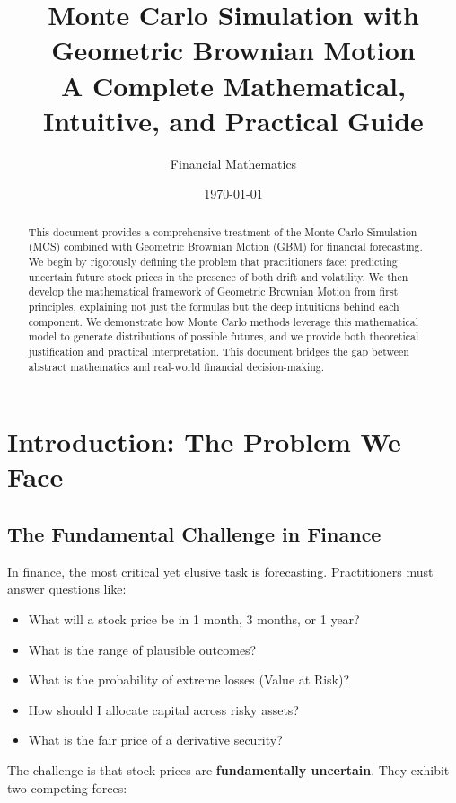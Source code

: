 \documentclass[12pt,a4paper]{article}
\title{\textbf{\Huge Monte Carlo Simulation with Geometric Brownian Motion} \\ \Large A Complete Mathematical, Intuitive, and Practical Guide}
\author{Financial Mathematics}
\date{\today}
\begin{document}
\maketitle

\begin{abstract}
This document provides a comprehensive treatment of the Monte Carlo Simulation (MCS) combined with Geometric Brownian Motion (GBM) for financial forecasting. We begin by rigorously defining the problem that practitioners face: predicting uncertain future stock prices in the presence of both drift and volatility. We then develop the mathematical framework of Geometric Brownian Motion from first principles, explaining not just the formulas but the deep intuitions behind each component. We demonstrate how Monte Carlo methods leverage this mathematical model to generate distributions of possible futures, and we provide both theoretical justification and practical interpretation. This document bridges the gap between abstract mathematics and real-world financial decision-making.
\end{abstract}

\newpage
\tableofcontents
\newpage

\section{Introduction: The Problem We Face}

\subsection{The Fundamental Challenge in Finance}

In finance, the most critical yet elusive task is forecasting. Practitioners must answer questions like:
\begin{itemize}
    \item What will a stock price be in 1 month, 3 months, or 1 year?
    \item What is the range of plausible outcomes?
    \item What is the probability of extreme losses (Value at Risk)?
    \item How should I allocate capital across risky assets?
    \item What is the fair price of a derivative security?
\end{itemize}

The challenge is that stock prices are \textbf{fundamentally uncertain}. They exhibit two competing forces:
\end{document}
